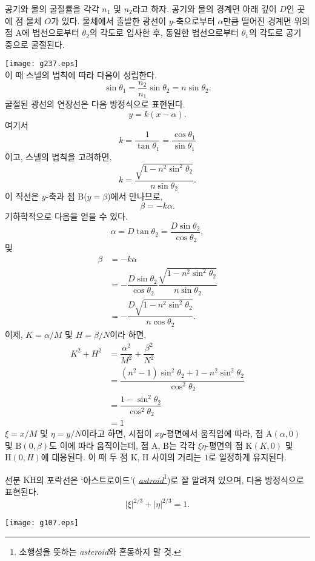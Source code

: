 \documentclass[twocolumn]{article}
\begin{document}
공기와 물의 굴절률을 각각 $n_1$ 및 $n_2$라고 하자. 공기와 물의 경계면 아래 깊이 $D$인 곳에 점 물체 $O$가 있다. 
물체에서 출발한 광선이 $y$-축으로부터 $\alpha$만큼 떨어진 경계면 위의 점 A에 
법선으로부터 $\theta_2$의 각도로 입사한 후, 동일한 법선으로부터 $\theta_1$의 각도로 공기 중으로 굴절된다.

\hfill \texttt{[image: g237.eps]}\hfill\null\\

이 때 스넬의 법칙에 따라 다음이 성립한다.
$$ \sin\theta_1 = \frac{n_2}{n_1} \sin\theta_2 = n\sin\theta_2.$$
굴절된 광선의 연장선은 다음 방정식으로 표현된다.
$$y=k(x-\alpha).$$
여기서 
$$k=\dfrac{1}{\tan\theta_1}=\dfrac{\cos\theta_1}{\sin\theta_1}$$
이고, 스넬의 법칙을 고려하면,
$$k=\dfrac{\sqrt{1-n^2\sin^2\theta_2}}{n\sin\theta_2}.$$
이 직선은 $y$-축과 점 B($y=\beta$)에서 만나므로,
$$\beta = -k\alpha.$$
기하학적으로 다음을 얻을 수 있다.
$$\alpha = D\tan\theta_2 = \dfrac{D\sin\theta_2}{\cos\theta_2},$$
및
$$\begin{aligned}
	\beta &= -k\alpha \\
	&= -\dfrac{D\sin\theta_2}{\cos\theta_2}
	\dfrac{\sqrt{1-n^2\sin^2\theta_2}}{n\sin\theta_2}\\
	&=-\dfrac{D\sqrt{1-n^2\sin^2\theta_2}}{n\cos\theta_2}.
\end{aligned}$$
이제, $K=\alpha/M$ 및 $H=\beta/N$이라 하면,
$$ \begin{aligned}
	K^2 + H^2 &= \dfrac{\alpha^2}{M^2}+\dfrac{\beta^2}{N^2}\\
	&=\dfrac{\left(n^2-1\right)\sin^2\theta_2 + 1-n^2\sin^2\theta_2}
	{\cos^2\theta_2}\\
	&=\dfrac{1-\sin^2\theta_2}{\cos^2\theta_2}\\
	&=1
\end{aligned}$$
$\xi=x/M$ 및 $\eta=y/N$이라고 하면, 시점이 $xy$-평면에서 움직임에 따라,
점 $\mathrm{A}(\alpha, 0)$ 및 $\mathrm{B}(0, \beta)$도 이에 따라 움직이는데, 
점  $\mathrm{A}$, $\mathrm{B}$는 각각  $\xi\eta$-평면의 점 $\mathrm{K}(K, 0)$
및 $\mathrm{H}(0, H)$에 대응된다. 이 때 두 점 $\mathrm{K}$, $\mathrm{H}$ 사이의 
거리는 $1$로 일정하게 유지된다.

선분 $\overline{\mathrm{KH}}$의 포락선은 `아스트로이드'(%
\href{https://en.wikipedia.org/wiki/Astroid}{\emph{astroid}}\footnote{
소행성을 뜻하는 \emph{asteroid}와 혼동하지 말 것.})로 잘 알려져 있으며, 
다음 방정식으로 표현된다.
$$ \left| \xi \right|^{2/3} + \left| \eta \right|^{2/3} = 1. $$

\hfill\texttt{[image: g107.eps]} \hfill\null
\end{document}
